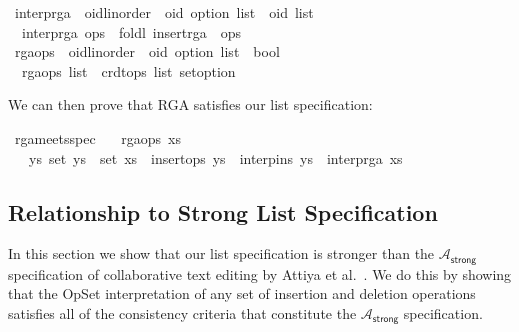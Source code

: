 \begin{isabelle}
\isanewline
{}\isamarkupfalse%
\ interp{\isacharunderscore}rga\ {\isacharcolon}{\isacharcolon}\ {\isachardoublequoteopen}{\isacharparenleft}{\isacharprime}oid{\isacharcolon}{\isacharcolon}{\isacharbraceleft}linorder{\isacharbraceright}\ {\isasymtimes}\ {\isacharprime}oid\ option{\isacharparenright}\ list\ {\isasymRightarrow}\ {\isacharprime}oid\ list{\isachardoublequoteclose}\ \isanewline
\ \ {\isachardoublequoteopen}interp{\isacharunderscore}rga\ ops\ {\isasymequiv}\ foldl\ insert{\isacharunderscore}rga\ {\isacharbrackleft}{\isacharbrackright}\ ops{\isachardoublequoteclose}\isanewline
\isanewline
{}\isamarkupfalse%
\ rga{\isacharunderscore}ops\ {\isacharcolon}{\isacharcolon}\ {\isachardoublequoteopen}{\isacharparenleft}{\isacharprime}oid{\isacharcolon}{\isacharcolon}{\isacharbraceleft}linorder{\isacharbraceright}\ {\isasymtimes}\ {\isacharprime}oid\ option{\isacharparenright}\ list\ {\isasymRightarrow}\ bool{\isachardoublequoteclose}\ \isanewline
\ \ {\isachardoublequoteopen}rga{\isacharunderscore}ops\ list\ {\isasymequiv}\ crdt{\isacharunderscore}ops\ list\ set{\isacharunderscore}option{\isachardoublequoteclose}
\end{isabelle}

\noindent We can then prove that RGA satisfies our list specification:
\begin{isabelle}
\isamarkupfalse%
\ rga{\isacharunderscore}meets{\isacharunderscore}spec{\isacharcolon}\isanewline
\ \ \ {\isachardoublequoteopen}rga{\isacharunderscore}ops\ xs{\isachardoublequoteclose}\isanewline
\ \ \ {\isachardoublequoteopen}{\isasymexists}ys{\isachardot}\ set\ ys\ {\isacharequal}\ set\ xs\ {\isasymand}\ insert{\isacharunderscore}ops\ ys\ {\isasymand}\ interp{\isacharunderscore}ins\ ys\ {\isacharequal}\ interp{\isacharunderscore}rga\ xs{\isachardoublequoteclose}
\end{isabelle}


\subsection{Relationship to Strong List Specification}

In this section we show that our list specification is stronger than the $\mathcal{A}_\textsf{strong}$ specification of collaborative text editing by Attiya et al.~\cite{Attiya:2016kh}.
We do this by showing that the OpSet interpretation of any set of insertion and deletion operations satisfies all of the consistency criteria that constitute the $\mathcal{A}_\textsf{strong}$ specification.

